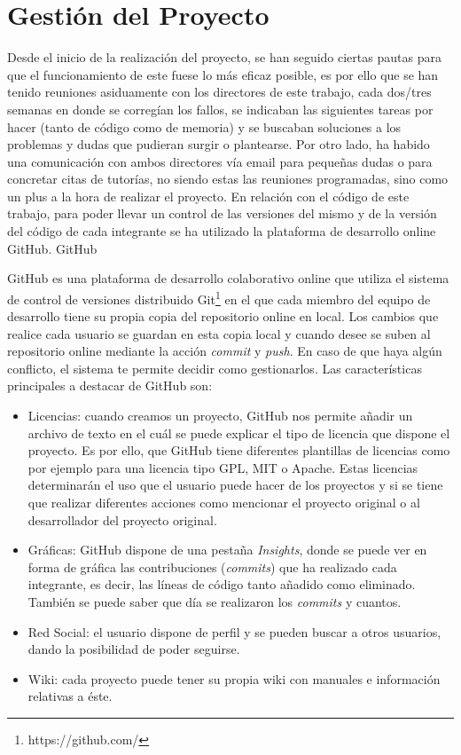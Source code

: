 \chapter{Gestión del Proyecto}
\label{cap:gestionProyecto}

Desde el inicio de la realización del proyecto, se han seguido ciertas pautas para que el funcionamiento de este fuese lo más eficaz posible, es por ello que se han tenido reuniones asiduamente con los directores de este trabajo, cada dos/tres semanas en donde se corregían los fallos, se indicaban las siguientes tareas por hacer (tanto de código como de memoria) y se buscaban soluciones a los problemas y dudas que pudieran surgir o plantearse.
Por otro lado, ha habido una comunicación con ambos directores vía email para pequeñas dudas o para concretar citas de tutorías, no siendo estas las reuniones programadas, sino como un plus a la hora de realizar el proyecto.
En relación con el código de este trabajo, para poder llevar un control de las versiones del mismo y de la versión del código de cada integrante se ha utilizado la plataforma de desarrollo online GitHub.
GitHub 



GitHub es una plataforma de desarrollo colaborativo online que utiliza el sistema de control de versiones distribuido Git\footnote{https://github.com/} en el que cada miembro del equipo de desarrollo tiene su propia copia del repositorio online en local. Los cambios que realice cada usuario se guardan en esta copia local y cuando desee se suben al repositorio online mediante la acción \textit{commit} y \textit{push}. En caso de que haya algún conflicto, el sistema te permite decidir como gestionarlos. 
Las características principales a destacar de GitHub son:
\begin{itemize}
\item Licencias: cuando creamos un proyecto, GitHub nos permite añadir un archivo de texto en el cuál se puede explicar el tipo de licencia que dispone el proyecto. Es por ello, que GitHub tiene diferentes plantillas de licencias como por ejemplo para una licencia tipo GPL, MIT o Apache. Estas licencias determinarán el uso que el usuario puede hacer de los proyectos y si se tiene que realizar diferentes acciones como mencionar el proyecto original o al desarrollador del proyecto original.
\item Gráficas: GitHub dispone de una pestaña \textit{Insights}, donde se puede ver en forma de gráfica las contribuciones (\textit{commits}) que ha realizado cada integrante, es decir, las líneas de código tanto añadido como eliminado. También se puede saber que día se realizaron los \textit{commits} y cuantos.
\item Red Social: el usuario dispone de perfil y se pueden buscar a otros usuarios, dando la posibilidad de poder seguirse.
\item Wiki: cada proyecto puede tener su propia wiki con manuales e información relativas a éste.
\end{itemize}


